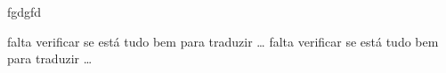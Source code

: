 \documentclass[11pt,twoside,a4paper]{report}
\begin{document}
       
       
  \TEXT{}
       {fgdgfd }
\EndTitlePage
\titlepage\ \endtitlepage %


\TitlePage
  \vspace*{55mm}
  {falta verificar se está tudo bem para traduzir \ldots}
  \vspace*{5mm}
       {falta verificar se está tudo bem para traduzir \ldots}
\EndTitlePage
\titlepage\ \endtitlepage %


%
%


\tableofcontents

\cleardoublepage
{}
\listoffigures



\cleardoublepage
{}
\listoftables




\cleardoublepage






%
%
\cleardoublepage
{}




\cleardoublepage


\cleardoublepage


\cleardoublepage



\cleardoublepage


\cleardoublepage


\cleardoublepage


\cleardoublepage


\cleardoublepage


\cleardoublepage



\medskip





%
%
\end{document}
